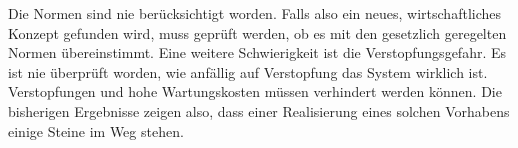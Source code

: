 \documentclass[12pt]{article}
\begin{document}
Die Normen sind nie berücksichtigt worden. Falls also ein neues, wirtschaftliches Konzept gefunden wird, muss geprüft werden, ob es mit den gesetzlich geregelten Normen übereinstimmt. Eine weitere Schwierigkeit ist die Verstopfungsgefahr. Es ist nie überprüft worden, wie anfällig auf Verstopfung das System wirklich ist. Verstopfungen und hohe Wartungskosten müssen verhindert werden können. Die bisherigen Ergebnisse zeigen also, dass einer Realisierung eines solchen Vorhabens einige Steine im Weg stehen.
\end{document}
